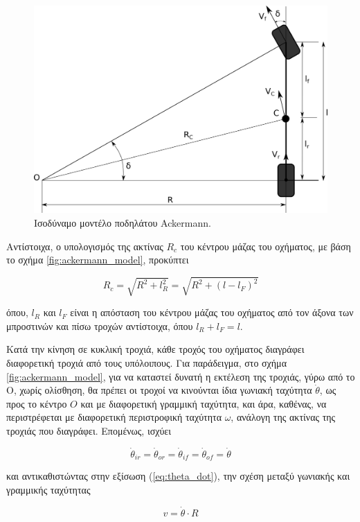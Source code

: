 {\begin{figure}[!ht]
	\centering
	\includegraphics[width=0.6\linewidth]{Chapters/Chapter2/Figures/ackermann_bicycle_model.png}
	\caption{Ισοδύναμο μοντέλο ποδηλάτου Ackermann.}
	\label{fig:ackermann_bicylce_model}
\end{figure}

\bigskip
Αντίστοιχα, ο υπολογισμός της ακτίνας $R_c$ του κέντρου μάζας του οχήματος, με βάση το σχήμα \ref{fig:ackermann_model}, προκύπτει 

\begin{equation}
	R_c = \sqrt{R^2 + l_R^2} = \sqrt{R^2 + (l - l_F)^2}
	\label{eq:ackermann_center_mass_turning_radius}
\end{equation}

\noindent
όπου, $l_R$ και $l_F$ είναι η απόσταση του κέντρου μάζας του οχήματος από τον άξονα των μπροστινών και πίσω τροχών αντίστοιχα, όπου $l_R + l_F = l$.

\bigskip
Κατά την κίνηση σε κυκλική τροχιά, κάθε τροχός του οχήματος διαγράφει διαφορετική τροχιά από τους υπόλοιπους. Για παράδειγμα, στο σχήμα \ref{fig:ackermann_model}, για να καταστεί δυνατή η εκτέλεση της τροχιάς, γύρω από το Ο, χωρίς ολίσθηση, θα πρέπει οι τροχοί να κινούνται ίδια γωνιακή ταχύτητα $\dot\theta$, ως προς το κέντρο $O$ και με διαφορετική γραμμική ταχύτητα, και άρα, καθένας, να περιστρέφεται με διαφορετική περιστροφική ταχύτητα $\omega$, ανάλογη της ακτίνας της τροχιάς που διαγράφει. Επομένως, ισχύει

\begin{equation}
	\dot\theta_{ir} = \dot\theta_{or} = \dot\theta_{if} = \dot\theta_{of} = \dot\theta
	\label{eq:theta_dot}
\end{equation}

\bigskip
\noindent
και αντικαθιστώντας στην εξίσωση (\ref{eq:theta_dot}), την σχέση μεταξύ γωνιακής και γραμμικής ταχύτητας
	
\begin{equation}
	v = \dot\theta \cdot R
	\label{eq:v_theta}
\end{equation}	

}
